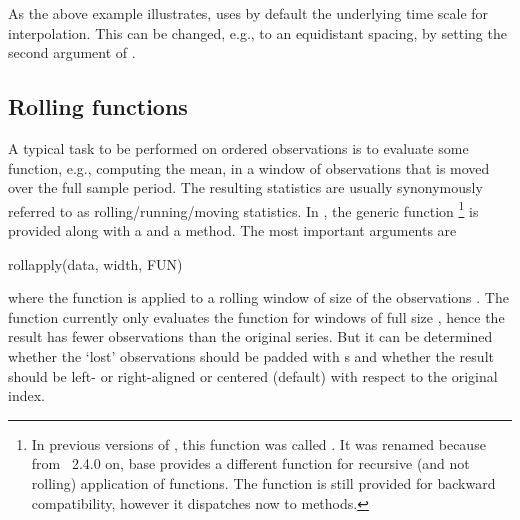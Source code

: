\documentclass[article,nojss]{jss}
\begin{document}
As the above example illustrates,  uses by default
the underlying time scale for interpolation. This can be changed, e.g.,
to an equidistant spacing, by setting the second argument of
.

\subsection{Rolling functions}
\label{sec:rolling}

A typical task to be performed on ordered observations is to evaluate some
function, e.g., computing the mean, in a window of observations that is moved
over the full sample period. The resulting statistics are usually synonymously referred to
as rolling/running/moving statistics. In , the generic function
\footnote{In previous versions of , this function was called
  . It was renamed because from ~2.4.0 on, base 
  provides a different function  for recursive (and not rolling) application
  of functions. The function  is still provided for backward compatibility,
  however it dispatches now to  methods.}
is provided along with a  and a  method. The most important arguments
are

\begin{Scode}
rollapply(data, width, FUN)
\end{Scode}

where the function  is applied to a rolling window of size 
of the observations . The function  currently only evaluates
the function for windows of full size , hence the result has 
fewer observations than the original series. But it can be determined whether the `lost'
observations should be padded with s and whether the result should be left-
or right-aligned or centered (default) with respect to the original index.
\end{document}
